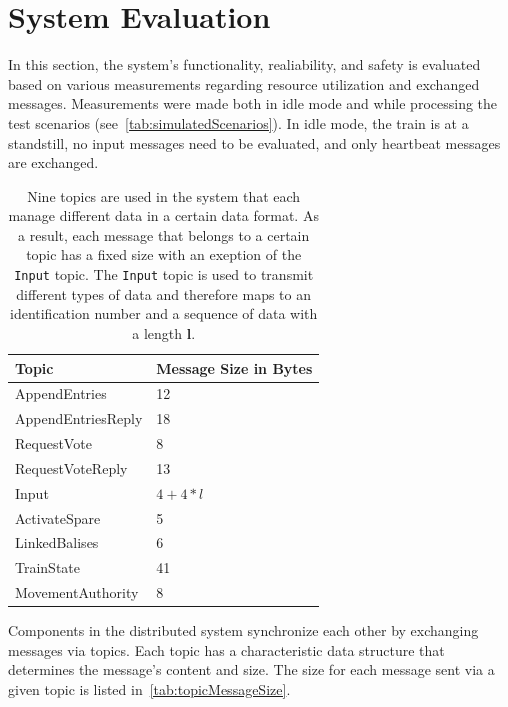 \section{System Evaluation}

In this section, the system's functionality, realiability, and safety is evaluated based on various measurements regarding resource utilization and exchanged messages.
Measurements were made both in idle mode and while processing the test scenarios (see~\autoref{tab:simulatedScenarios}).
In idle mode, the train is at a standstill, no input messages need to be evaluated, and only heartbeat messages are exchanged.

\begin{table}[h!]
	\begin{center}
		\caption{Nine topics are used in the system that each manage different data in a certain data format. As a result, each message that belongs to a certain topic has a fixed size with an exeption of the \texttt{Input} topic. The \texttt{Input} topic is used to transmit different types of data and therefore maps to an identification number and a sequence of data with a length \textbf{l}.}
		\label{tab:topicMessageSize}
		\begin{tabularx}{\textwidth}{|X|X|}
			\hline
			\textbf{Topic} & \textbf{Message Size in Bytes} \\
			\hline \hline
			AppendEntries & 12 \\
			\hline
			AppendEntriesReply & 18 \\
			\hline
			RequestVote & 8 \\
			\hline
			RequestVoteReply & 13 \\
			\hline
			Input & $4 + 4 * l$  \\
			\hline
			ActivateSpare & 5 \\
			\hline
			LinkedBalises & 6 \\
			\hline
			TrainState & 41 \\
			\hline
			MovementAuthority & 8 \\
			\hline
		\end{tabularx}
	\end{center}
\end{table}

Components in the distributed system synchronize each other by exchanging messages via  topics.
Each topic has a characteristic data structure that determines the message's content and size.
The size for each message sent via a given topic is listed in~\autoref{tab:topicMessageSize}.
\\

